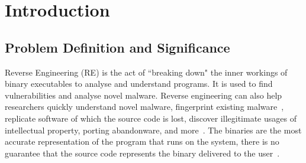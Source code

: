 \chapter{Introduction}
\label{introduction}




\section{Problem Definition and Significance}
Reverse Engineering (RE) is the act of ``breaking down" the inner workings of binary executables to analyse and understand programs. It is used to find vulnerabilities and analyse novel malware. Reverse engineering can also help researchers quickly understand novel malware, fingerprint existing malware~\cite{reverseEngineerProcess}, replicate software of which the source code is lost, discover illegitimate usages of intellectual property, porting abandonware, and more~\cite{TypeInferenceSurvey}. The binaries are the most accurate representation of the program that runs on the system, there is no guarantee that the source code represents the binary delivered to the user~\cite{TypeInferenceSurvey}.

